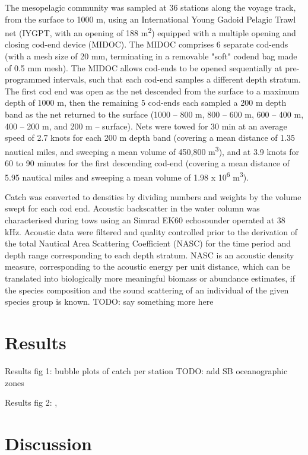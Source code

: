 \documentclass[12pt]{article}
\begin{document}
{The mesopelagic community was sampled at 36 stations along the voyage track, from the surface to 1000 m, using an International Young Gadoid Pelagic Trawl net (IYGPT, with an opening of 188 m\textsuperscript{2}) equipped with a multiple opening and closing cod-end device (MIDOC). 
The MIDOC comprises 6 separate cod-ends (with a mesh size of 20 mm, terminating in a removable "soft" codend bag made of 0.5 mm mesh). 
The MIDOC allows cod-ends to be opened sequentially at pre-programmed intervals, such that each cod-end samples a different depth stratum.
The first cod end was open as the net descended from the surface to a maximum depth of 1000 m, then the remaining 5 cod-ends each sampled a 200 m depth band as the net returned to the surface (1000 – 800 m, 800 – 600 m, 600 – 400 m, 400 – 200 m, and 200 m – surface).
Nets were towed for 30 min at an average speed of 2.7 knots for each 200 m depth band (covering a mean distance of 1.35 nautical miles, and sweeping a mean volume of 450,800 m\textsuperscript{3}), and at 3.9 knots for 60 to 90 minutes for the first descending cod-end (covering a mean distance of 5.95 nautical miles and sweeping a mean volume of 1.98 x 10\textsuperscript{6} m\textsuperscript{3}). 


Catch was converted to densities by dividing numbers and weights by the volume swept for each cod end. Acoustic backscatter in the water column was characterised during tows using an Simrad EK60 echosounder operated at 38 kHz.
Acoustic data were filtered and quality controlled prior to the derivation of the total Nautical Area Scattering Coefficient (NASC) for the time period and depth range corresponding to each depth stratum. NASC is an acoustic density measure, corresponding to the acoustic energy per unit distance, which can be translated into biologically more meaningful biomass or abundance estimates, if the species composition and the sound scattering of an individual of the given species group is known.
TODO: say something more here


\section{Results}

Results fig 1: bubble plots of catch per station
	TODO: add SB oceanographic zones

Results fig 2: ,

\section{Discussion}

}
\end{document}
